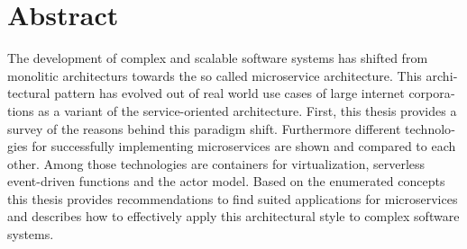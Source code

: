 \chapter{Abstract}

\begin{english} %

The development of complex and scalable software systems has shifted from monolitic architecturs towards the so called microservice architecture. This architectural pattern has evolved out of real world use cases of large internet corporations as a variant of the service-oriented architecture. First, this thesis provides a survey of the reasons behind this paradigm shift. Furthermore different technologies for successfully implementing microservices are shown and compared to each other. Among those technologies are containers for virtualization, serverless event-driven functions and the actor model. Based on the enumerated concepts this thesis provides recommendations to find suited applications for microservices and describes how to effectively apply this architectural style to complex software systems.

\end{english}
